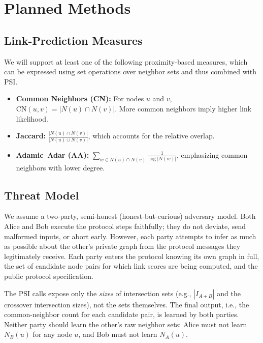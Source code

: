 \documentclass[sigconf]{acmart}
\begin{document}
\section{Planned Methods}

\subsection{Link-Prediction Measures}
We will support at least one of the following proximity-based measures, which can be expressed using set operations over neighbor sets and thus combined with PSI.

\begin{itemize}
  \item \textbf{Common Neighbors (CN):} For nodes $u$ and $v$, $\text{CN}(u,v) = |N(u) \cap N(v)|$. More common neighbors imply higher link likelihood.
  \item \textbf{Jaccard:} $\frac{|N(u) \cap N(v)|}{|N(u) \cup N(v)|}$, which accounts for the relative overlap.
  \item \textbf{Adamic--Adar (AA):} $\sum_{w \in N(u) \cap N(v)} \frac{1}{\log |N(w)|}$, emphasizing common neighbors with lower degree.
\end{itemize}

\subsection{Threat Model}
We assume a two-party, semi-honest (honest-but-curious) adversary model. Both Alice and Bob execute the protocol steps faithfully; they do not deviate, send malformed inputs, or abort early. However, each party attempts to infer as much as possible about the other's private graph from the protocol messages they legitimately receive. Each party enters the protocol knowing its own graph in full, the set of candidate node pairs for which link scores are being computed, and the public protocol specification.

The PSI calls expose only the \emph{sizes} of intersection sets (e.g., $|I_{A+B}|$ and the crossover intersection sizes), not the sets themselves. The final output, i.e., the common-neighbor count for each candidate pair, is learned by both parties. Neither party should learn the other's raw neighbor sets: Alice must not learn $N_B(u)$ for any node $u$, and Bob must not learn $N_A(u)$.
\end{document}
